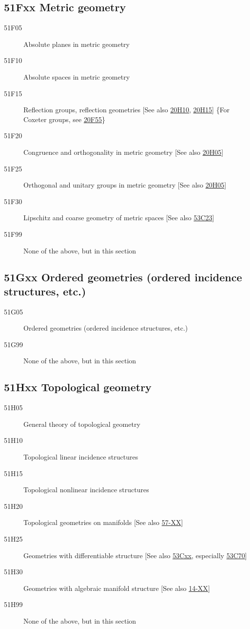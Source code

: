 \documentclass[letterpaper]{article}
\begin{document}
\subsection*{51Fxx  Metric geometry }\label{51Fxx}
\begin{description}  
\item [51F05]\label{51F05} Absolute planes in metric geometry
\item [51F10]\label{51F10} Absolute spaces in metric geometry
\item [51F15]\label{51F15} Reflection groups, reflection geometries [See also \hyperref[20H10]{20H10}, \hyperref[20H15]{20H15}] \{For Coxeter groups, see \hyperref[20F55]{20F55}\}
\item [51F20]\label{51F20} Congruence and orthogonality in metric geometry [See also \hyperref[20H05]{20H05}]
\item [51F25]\label{51F25} Orthogonal and unitary groups  in metric geometry [See also \hyperref[20H05]{20H05}]
\item [51F30]\label{51F30} Lipschitz and coarse geometry of metric spaces [See also \hyperref[53C23]{53C23}]
\item [51F99]\label{51F99} None of the above, but in this section
\end{description}
\subsection*{51Gxx  Ordered geometries (ordered incidence structures, etc.) }\label{51Gxx}
\begin{description}  
\item [51G05]\label{51G05} Ordered geometries (ordered incidence structures, etc.)
\item [51G99]\label{51G99} None of the above, but in this section
\end{description}
\subsection*{51Hxx  Topological geometry }\label{51Hxx}
\begin{description}  
\item [51H05]\label{51H05} General theory of topological geometry
\item [51H10]\label{51H10} Topological linear incidence structures
\item [51H15]\label{51H15} Topological nonlinear incidence structures
\item [51H20]\label{51H20} Topological geometries on manifolds [See also \hyperref[57-XX]{57-XX}]
\item [51H25]\label{51H25} Geometries with differentiable structure [See also \hyperref[53Cxx]{53Cxx}, especially  \hyperref[53C70]{53C70}]
\item [51H30]\label{51H30} Geometries with algebraic manifold structure [See also \hyperref[14-XX]{14-XX}]
\item [51H99]\label{51H99} None of the above, but in this section
\end{description}
\end{document}
